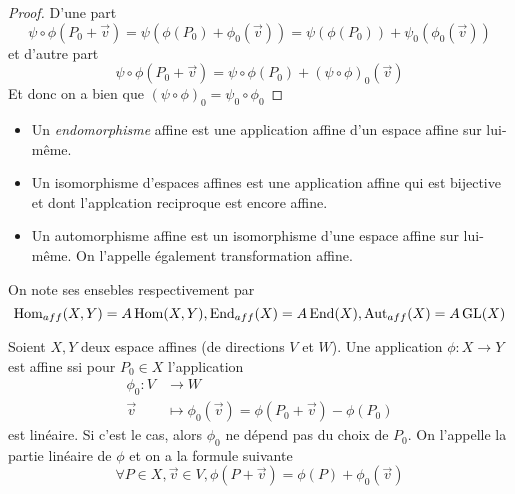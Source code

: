\begin{proof}
	D'une part
	\begin{equation*}
		\psi \circ \phi (P_0 + \vec{v}) = \psi(\phi(P_0) + \phi_0(\vec{v}))
		= \psi(\phi(P_0)) + \psi_0(\phi_0(\vec{v}))
	\end{equation*}
	et d'autre part 
	\begin{equation*}
		\psi \circ \phi (P_0 + \vec{v})
		= \psi \circ \phi(P_0) + (\psi \circ \phi)_0(\vec{v})
	\end{equation*}
	Et donc on a bien que $(\psi \circ \phi)_0 = \psi_0 \circ \phi_0$ 
\end{proof}

\begin{definition}
	\begin{itemize}
		\item Un \emph{endomorphisme} affine est une application affine d'un
			espace affine sur lui-même.
		\item Un isomorphisme d'espaces affines est une application affine
			qui est bijective et dont l'applcation reciproque est encore affine.
		\item Un automorphisme affine est un isomorphisme d'une espace affine sur
			lui-même. On l'appelle également transformation affine.
	\end{itemize}
	On note ses ensebles respectivement par
	\begin{equation*}
		\operatorname{Hom}_{aff}(X, Y) = A \operatorname{Hom}(X, Y), \operatorname{End}_{aff}(X) = A\operatorname{End}(X),
		\operatorname{Aut}_{aff}(X) = A\operatorname{GL}(X)
	\end{equation*}
\end{definition}



\begin{theorem}
	Soient $X, Y$ deux espace affines (de directions $V$ et $W$). Une application
	$\phi: X \to Y$ est affine ssi pour $P_0 \in X$ l'application
	\begin{align*}
		\phi_0: V &\to W\\
		\vec{v} &\mapsto \phi_0(\vec{v}) = \phi(P_0 + \vec{v}) - \phi(P_0)	
	\end{align*}
	est linéaire. Si c'est le cas, alors $\phi_0$ ne dépend pas du choix de
	$P_0$. On l'appelle la partie linéaire de $\phi$ et on a la formule suivante
	\begin{equation*}
		\forall P\in X, \vec{v} \in V, \phi(P+\vec{v}) = \phi(P) + \phi_0(\vec{v})
	\end{equation*}
\end{theorem}

